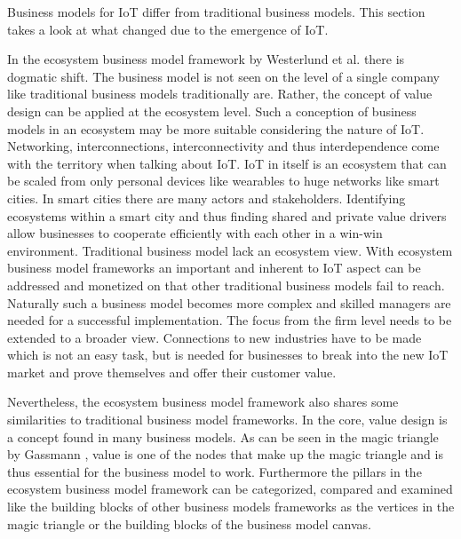 	Business models for IoT differ from traditional business models. This section takes a look at what changed due to the emergence of IoT.

	In the ecosystem business model framework by Westerlund et al. \cite{westerlund} there is dogmatic shift. The business model is not seen on the level of a single company like traditional business models traditionally are. Rather, the concept of value design can be applied at the ecosystem level. Such a conception of business models in an ecosystem may be more suitable considering the nature of IoT. Networking, interconnections, interconnectivity and thus interdependence come with the territory when talking about IoT. IoT in itself is an ecosystem that can be scaled from only personal devices like wearables to huge networks like smart cities. In smart cities there are many actors and stakeholders. Identifying ecosystems within a smart city and thus finding shared and private value drivers allow businesses to cooperate efficiently with each other in a win-win environment. Traditional business model lack an ecosystem view. With ecosystem business model frameworks an important and inherent to IoT aspect can be addressed and monetized on that other traditional business models fail to reach. Naturally such a business model becomes more complex and skilled managers are needed for a successful implementation. The focus from the firm level needs to be extended to a broader view. Connections to new industries have to be made which is not an easy task, but is needed for businesses to break into the new IoT market and prove themselves and offer their customer value.

	Nevertheless, the ecosystem business model framework also shares some similarities to traditional business model frameworks. In the core, value design is a concept found in many business models. As can be seen in the magic triangle by Gassmann \cite{gassmann55}, value is one of the nodes that make up the magic triangle and is thus essential for the business model to work. Furthermore the pillars in the ecosystem business model framework can be categorized, compared and examined like the building blocks of other business models frameworks as the vertices in the magic triangle or the building blocks of the business model canvas.


